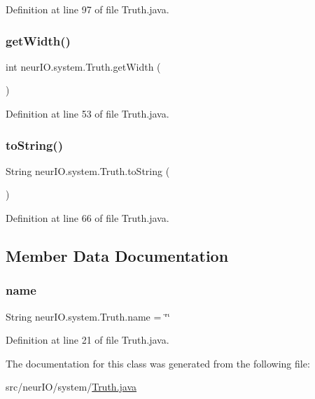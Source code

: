 Definition at line 97 of file Truth.\+java.

\mbox{\label{classneur_i_o_1_1system_1_1_truth_a842f96b6b8887a8c0efaa6d2b9f1a7c4}} 
\subsubsection{\texorpdfstring{get\+Width()}{getWidth()}}
{\footnotesize\ttfamily int neur\+I\+O.\+system.\+Truth.\+get\+Width (\begin{DoxyParamCaption}{ }\end{DoxyParamCaption})}



Definition at line 53 of file Truth.\+java.

\mbox{\label{classneur_i_o_1_1system_1_1_truth_ac7f532c2a20156db2b85b799730ee959}} 
\subsubsection{\texorpdfstring{to\+String()}{toString()}}
{\footnotesize\ttfamily String neur\+I\+O.\+system.\+Truth.\+to\+String (\begin{DoxyParamCaption}{ }\end{DoxyParamCaption})}



Definition at line 66 of file Truth.\+java.



\subsection{Member Data Documentation}
\mbox{\label{classneur_i_o_1_1system_1_1_truth_a73e0e02b8591832131d0c26d1f88dea2}} 
\subsubsection{\texorpdfstring{name}{name}}
{\footnotesize\ttfamily String neur\+I\+O.\+system.\+Truth.\+name = \char`\"{}\char`\"{}}



Definition at line 21 of file Truth.\+java.



The documentation for this class was generated from the following file\+:\begin{DoxyCompactItemize}
\item 
src/neur\+I\+O/system/\hyperlink{_truth_8java}{Truth.\+java}\end{DoxyCompactItemize}
